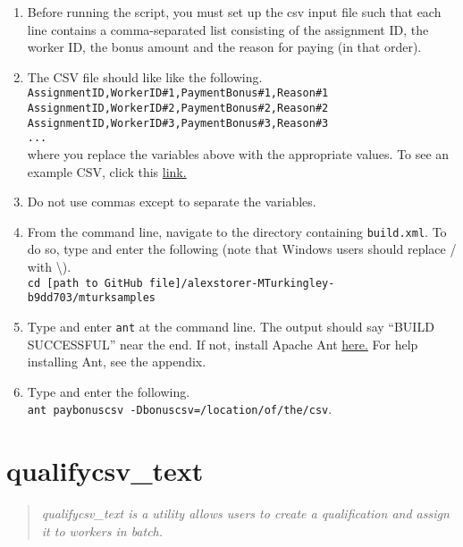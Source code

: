 \documentclass[10pt]{article}
\begin{document}
\begin{enumerate}
	\item Before running the script, you must set up the csv input file such that each line contains a comma-separated list consisting of the assignment ID, the worker ID, the bonus amount and the reason for paying (in that order). 
	\item The CSV file should like like the following.\\
	\verb+AssignmentID,WorkerID#1,PaymentBonus#1,Reason#1+\\
	\verb+AssignmentID,WorkerID#2,PaymentBonus#2,Reason#2+\\
	\verb+AssignmentID,WorkerID#3,PaymentBonus#3,Reason#3+\\
	\verb+...+\\
	where you replace the variables above with the appropriate values. To see an example CSV, click this \href{https://dl.dropbox.com/u/9693706/bonus.csv}{link.}
	\item Do not use commas except to separate the variables.
	\item From the command line, navigate to the directory containing \verb+build.xml+. To do so, type and enter the following (note that Windows users should replace / with \textbackslash).\\
	\verb+cd [path to GitHub file]/alexstorer-MTurkingley-b9dd703/mturksamples+
	\item Type and enter \verb+ant+ at the command line. The output should say ``BUILD SUCCESSFUL'' near the end. If not, install Apache Ant \href{http://ant.apache.org/}{here.} For help installing Ant, see the appendix.
	\item Type and enter the following.\\ \verb+ant paybonuscsv -Dbonuscsv=/location/of/the/csv+.
\end{enumerate}

\section*{qualifycsv\_text}

\begin{quotation}
\noindent \emph{qualifycsv\_text is a utility allows users to create a qualification and assign it to workers in batch.}
\end{quotation}
\end{document}
